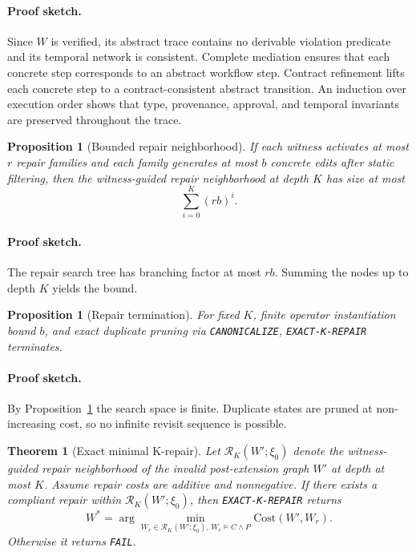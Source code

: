 \documentclass[11pt]{article}
\newtheorem{proposition}[definition]{Proposition}
\newtheorem{theorem}[definition]{Theorem}
\begin{document}
\paragraph{Proof sketch.}
Since $W$ is verified, its abstract trace contains no derivable violation predicate and its temporal network is consistent. Complete mediation ensures that each concrete step corresponds to an abstract workflow step. Contract refinement lifts each concrete step to a contract-consistent abstract transition. An induction over execution order shows that type, provenance, approval, and temporal invariants are preserved throughout the trace.

\begin{proposition}[Bounded repair neighborhood]\label{prop:bounded-space}
If each witness activates at most $r$ repair families and each family generates at most $b$ concrete edits after static filtering, then the witness-guided repair neighborhood at depth $K$ has size at most
\[
\sum_{i=0}^{K}(rb)^i.
\]
\end{proposition}

\paragraph{Proof sketch.}
The repair search tree has branching factor at most $rb$. Summing the nodes up to depth $K$ yields the bound.

\begin{proposition}[Repair termination]
For fixed $K$, finite operator instantiation bound $b$, and exact duplicate pruning via \texttt{CANONICALIZE}, \texttt{EXACT-K-REPAIR} terminates.
\end{proposition}

\paragraph{Proof sketch.}
By Proposition~\ref{prop:bounded-space} the search space is finite. Duplicate states are pruned at non-increasing cost, so no infinite revisit sequence is possible.

\begin{theorem}[Exact minimal K-repair]
Let $\mathcal{R}_K(W';\xi_0)$ denote the witness-guided repair neighborhood of the invalid post-extension graph $W'$ at depth at most $K$. Assume repair costs are additive and nonnegative. If there exists a compliant repair within $\mathcal{R}_K(W';\xi_0)$, then \texttt{EXACT-K-REPAIR} returns
\[
W^*=\arg\min_{W_r \in \mathcal{R}_K(W';\xi_0),\, W_r \models C \land P} \text{Cost}(W',W_r).
\]
Otherwise it returns \texttt{FAIL}.
\end{theorem}
\end{document}
